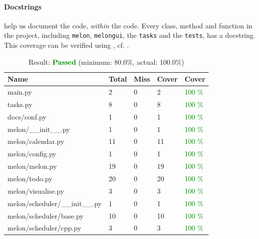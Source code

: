 \documentclass{prettytex/ox/mmsc-special-topic}
\begin{document}
  \paragraph{Docstrings} help us document the code, \textit{within} the code. Every class, method and function in the project, including \texttt{melon}, \texttt{melongui}, the \texttt{tasks} and the \texttt{tests}, has a docstring.
  This coverage can be verified using , cf. .

  \begin{table}
    \centering
    \caption{Result: \textcolor{green}{\bf Passed} (minimum: 80.0\%, actual: 100.0\%)}
    \begin{tabular}{lllll}
      \hline
      \bf Name                        & \bf Total & \bf Miss & \bf Cover & \bf Cover                 \\
      \hline
      main.py                         & 2         & 0        & 2         & \textcolor{green}{100 \%} \\
      tasks.py                        & 8         & 0        & 8         & \textcolor{green}{100 \%} \\
      docs/conf.py                    & 1         & 0        & 1         & \textcolor{green}{100 \%} \\
      melon/\_\_init\_\_.py           & 1         & 0        & 1         & \textcolor{green}{100 \%} \\
      melon/calendar.py               & 11        & 0        & 11        & \textcolor{green}{100 \%} \\
      melon/config.py                 & 1         & 0        & 1         & \textcolor{green}{100 \%} \\
      melon/melon.py                  & 19        & 0        & 19        & \textcolor{green}{100 \%} \\
      melon/todo.py                   & 20        & 0        & 20        & \textcolor{green}{100 \%} \\
      melon/visualise.py              & 3         & 0        & 3         & \textcolor{green}{100 \%} \\
      melon/scheduler/\_\_init\_\_.py & 1         & 0        & 1         & \textcolor{green}{100 \%} \\
      melon/scheduler/base.py         & 10        & 0        & 10        & \textcolor{green}{100 \%} \\
      melon/scheduler/cpp.py          & 3         & 0        & 3         & \textcolor{green}{100 \%} \\

\end{tabular}
\end{table}
\end{document}
